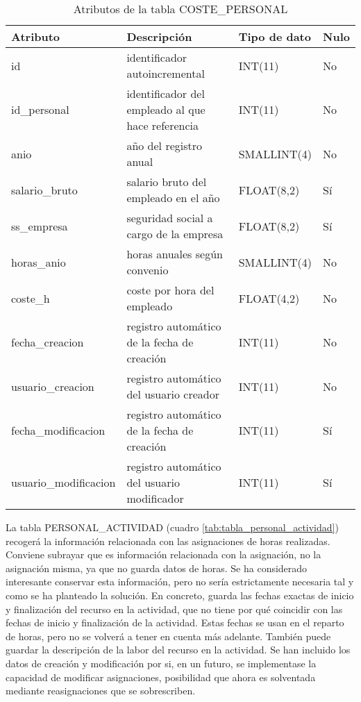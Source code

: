 \begin{table}
\small
\centering
\begin{tabular}{|l|p{2in}|l|l|}\hline
\textbf{Atributo} & \textbf{Descripción} & \textbf{Tipo de dato} &
\textbf{Nulo} \\\hline\hline
id & identificador autoincremental & INT(11) & No\\\hline
id\_personal & identificador del empleado al que hace referencia & INT(11) &
No\\\hline
anio & año del registro anual & SMALLINT(4) & No\\\hline
salario\_bruto & salario bruto del empleado en el año & FLOAT(8,2) & Sí\\\hline
ss\_empresa & seguridad social a cargo de la empresa & FLOAT(8,2) & Sí\\\hline
horas\_anio & horas anuales según convenio & SMALLINT(4) & No\\\hline
coste\_h & coste por hora del empleado & FLOAT(4,2) & No\\\hline
fecha\_creacion & registro automático de la fecha de creación & INT(11) &
No\\\hline
usuario\_creacion & registro automático del usuario creador & INT(11) &
No\\\hline
fecha\_modificacion & registro automático de la fecha de creación & INT(11) &
Sí\\\hline
usuario\_modificacion & registro automático del usuario modificador & INT(11) &
Sí\\\hline
\end{tabular}
\caption{Atributos de la tabla COSTE\_PERSONAL}
\label{tab:tabla_coste_personal}
\end{table}

La tabla PERSONAL\_ACTIVIDAD (cuadro \ref{tab:tabla_personal_actividad})
recogerá la información relacionada con las asignaciones de horas realizadas.
Conviene subrayar que es información relacionada con la asignación, no la
asignación misma, ya que no guarda datos de horas. Se ha considerado
interesante conservar esta información, pero no sería estrictamente necesaria
tal y como se ha planteado la solución. En concreto, guarda las fechas exactas
de inicio y finalización del recurso en la actividad, que no tiene por qué
coincidir con las fechas de inicio y finalización de la actividad. Estas fechas
se usan en el reparto de horas, pero no se volverá a tener en cuenta más
adelante. También puede guardar la descripción de la labor del recurso en la
actividad. Se han incluido los datos de creación y modificación por si, en un
futuro, se implementase la capacidad de modificar asignaciones, posibilidad que
ahora es solventada mediante reasignaciones que se sobrescriben.

